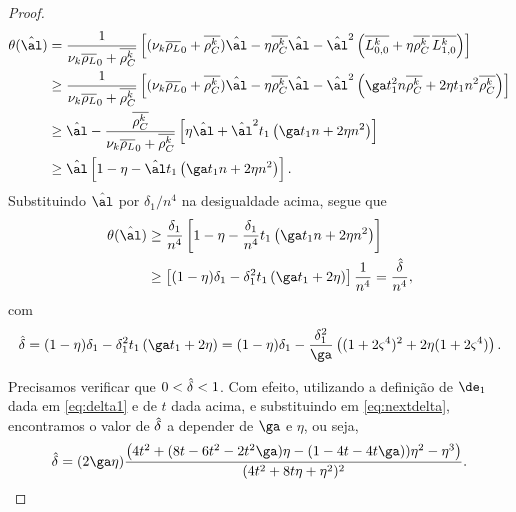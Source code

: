 \begin{proof}
	\begin{align}
		\theta(\nextal)%
						& = \dfrac{1}{\nuk \dbvec{\rho_L}_0 + \rhoCkb }\left[ (\nuk \dbvec{\rho_L}_0 + \rhoCkb )\nextal -  \eta\rhoCkb \nextal - \nextal^{2}\left(\dbvec{L_{0,0}^{k}} + \eta\rhoCkb \, \dbvec{L_{1,0}^{k}} \right) \right] \notag\\
						& \geq \dfrac{1}{\nuk \dbvec{\rho_L}_0 + \rhoCkb }\left[ (\nuk \dbvec{\rho_L}_0 + \rhoCkb )\nextal -  \eta\rhoCkb \nextal - \nextal^{2}\left(\ga t_{1}^{2} n\rhoCkb  + 2\eta t_1 n^{2}\rhoCkb  \right) \right]\notag\\
						& \geq \nextal - \dfrac{\rhoCkb }{\nuk \dbvec{\rho_L}_0 + \rhoCkb } \left[   \eta\nextal + \nextal^{2} t_{1}\left(\ga t_1 n + 2\eta  n^{2}  \right) \right]\notag\\
						& \geq \nextal \left[ 1 -  \eta - \nextal t_{1}\left(\ga t_1 n + 2\eta  n^{2}  \right) \right]. \notag
	\end{align}
Substituindo $\nextal$ por $\delta_{1}/n^{4}$ na desigualdade acima, segue que  	
	\begin{align}
			\theta(\nextal)			& \geq \frac{\delta_{1}}{n^{4}} \left[ 1 -  \eta - \frac{\delta_{1}}{n^{4}}t_{1}\left(\ga t_1 n + 2\eta  n^{2}  \right) \right]\notag \\
						& \geq 	 \left[ (1 -  \eta)\delta_{1} - \delta_{1}^{2}t_{1}\left(\ga t_1  + 2\eta    \right) \right] \frac{1}{n^{4}}	
						 = \frac{\nextdel}{n^{4}},\label{eq:theta-nextalpha}		
		\end{align}
	com 	\begin{equation}
		\label{eq:nextdelta}
		\nextdel = 
	(1 -  \eta)\delta_{1} - \delta_{1}^{2}t_{1}\left(\ga t_{1}  + 2\eta    \right) = (1 -  \eta)\delta_{1} - \dfrac{\delta_{1}^{2}}{\ga}\left((1+2\bdxzstar^{4})^{2}  + 2\eta(1+2\bdxzstar^{4})    \right).
	\end{equation} 
	
	 Precisamos verificar que $0<\hat{\delta}<1$.
Com efeito, utilizando a definição de $\de_1$ dada em \eqref{eq:delta1} e de $t$ dada acima, e substituindo em \eqref{eq:nextdelta}, encontramos o valor de $\hat{\delta}$ a depender de $\ga$ e $\eta$,  ou seja, 
	\begin{equation*}
		\nextdel = (2\ga\eta)\frac{\left(4 t^2 +(8t - 6t^2   -2t^2\ga) \eta - ( 1 - 4t    - 4t   \ga) ) \eta^2 - \eta^3\right)}{(4t^2 + 8t\eta + \eta^{2})^{2}}.
	\end{equation*}


\end{proof}
